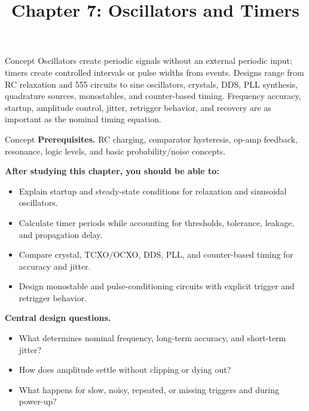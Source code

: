 \documentclass[10pt,letterpaper]{article}
\title{Chapter 7: Oscillators and Timers}
\author{}
\date{}
\begin{document}
\maketitle

\begin{CornellOverviewBox}{Concept}
Oscillators create periodic signals without an external periodic input; timers create controlled intervals or pulse widths from events. Designs range from RC relaxation and 555 circuits to sine oscillators, crystals, DDS, PLL synthesis, quadrature sources, monostables, and counter-based timing. Frequency accuracy, startup, amplitude control, jitter, retrigger behavior, and recovery are as important as the nominal timing equation.
\end{CornellOverviewBox}
\begin{CornellOverviewBox}{Concept}
\textbf{Prerequisites.} RC charging, comparator hysteresis, op-amp feedback, resonance, logic levels, and basic probability/noise concepts.

\textbf{After studying this chapter, you should be able to:}
\begin{itemize}
  \item Explain startup and steady-state conditions for relaxation and sinusoidal oscillators.
  \item Calculate timer periods while accounting for thresholds, tolerance, leakage, and propagation delay.
  \item Compare crystal, TCXO/OCXO, DDS, PLL, and counter-based timing for accuracy and jitter.
  \item Design monostable and pulse-conditioning circuits with explicit trigger and retrigger behavior.
\end{itemize}\textbf{Central design questions.}
\begin{itemize}
  \item What determines nominal frequency, long-term accuracy, and short-term jitter?
  \item How does amplitude settle without clipping or dying out?
  \item What happens for slow, noisy, repeated, or missing triggers and during power-up?
\end{itemize}\end{CornellOverviewBox}
\end{document}
